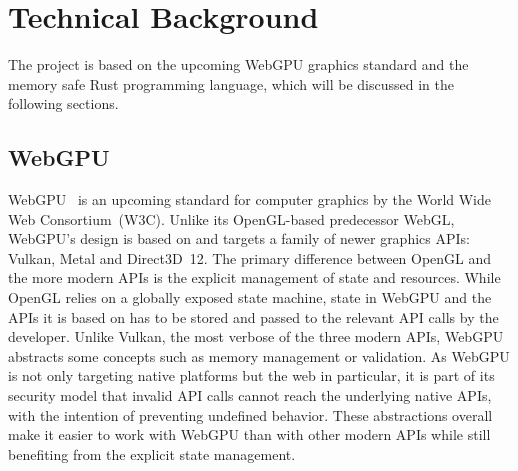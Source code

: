 \chapter{Technical Background}

The project is based on the upcoming WebGPU graphics standard and the memory safe Rust programming language, which will be discussed in the following sections.

\section{WebGPU}

WebGPU~\cite{malyshauWebGPU2021} is an upcoming standard for computer graphics by the World Wide Web Consortium~(W3C).
Unlike its OpenGL-based predecessor WebGL, WebGPU's design is based on and targets a family of newer graphics APIs: Vulkan, Metal and Direct3D~12.
The primary difference between OpenGL and the more modern APIs is the explicit management of state and resources.
While OpenGL relies on a globally exposed state machine, state in WebGPU and the APIs it is based on has to be stored and passed to the relevant API calls by the developer.
Unlike Vulkan, the most verbose of the three modern APIs, WebGPU abstracts some concepts such as memory management or validation.
As WebGPU is not only targeting native platforms but the web in particular, it is part of its security model that invalid API calls cannot reach the underlying native APIs, with the intention of preventing undefined behavior.
These abstractions overall make it easier to work with WebGPU than with other modern APIs while still benefiting from the explicit state management.


